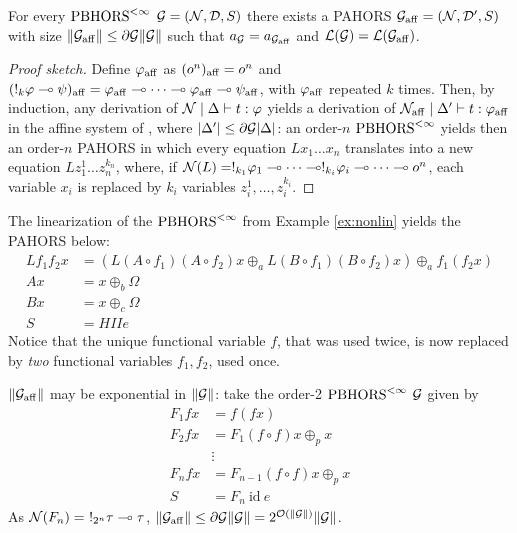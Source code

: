 \begin{theorem}[Linearization]
	\label{theorem:linearisation}
For every $\text{PBHORS}^{<\infty}$ $\mathcal{G}=(\mathcal{N}, \mathcal{D}, S)$ there exists a PAHORS $\mathcal{G}_{\mathrm{aff}}=(\mathcal{N}, \mathcal{D}',S)$ with size $\|\mathcal{G}_{\mathrm{aff}}\|\leq \partial\mathcal{G}{\|\mathcal{G}\|}$  such that 
$a_{\mathcal{G}}=a_{\mathcal{G}_{\mathrm{aff}}}$ and 
$\mathcal{L}(\mathcal{G})=\mathcal{L}(\mathcal{G}_{\mathrm{aff}})$.

\end{theorem}
\begin{proof}[Proof sketch]
Define $\varphi_{\mathrm{aff}}$ as $
(o^n)_{\mathrm{aff}}=o^n$ and 
$(!_k\varphi\multimap \psi)_{\mathrm{aff}}={\varphi_{\mathrm{aff}}\multimap\dots\multimap\varphi_{\mathrm{aff}}}\multimap\psi_{\mathrm{aff}}$, with $\varphi_{\mathrm{aff}}$ repeated $k$ times. 
Then, by induction, any derivation of $\mathcal{N}\mid \Delta\vdash t:\varphi$ yields a derivation of $\mathcal{N}_{\mathrm{aff}}\mid\Delta'\vdash t:\varphi_{\mathrm{aff}}$ in the affine system of \cite{DBLP:conf/lics/LiMO22}, where $|\Delta'|\leq \partial\mathcal{G}|\Delta|$: an order-$n$ $\text{PBHORS}^{<\infty}$ yields then an order-$n$ PAHORS in which every equation $Lx_1\dots x_n$ translates into a new equation $Lz_1^1\dots z_{n}^{k_n}$, where, if $\mathcal{N}(L)=!_{k_1}\varphi_1\multimap\dots \multimap !_{k_i}\varphi_i\multimap\dots\multimap o^n$, each variable $x_i$ is replaced by $k_i$ variables $z_i^1,\dots, z_{i}^{k_i}$.
\end{proof}


\begin{example}
The linearization of the $\text{PBHORS}^{<\infty}$ from Example \ref{ex:nonlin} yields the PAHORS below:
{\small
\begin{align*}\label{eq:phors2}
Lf_1f_2x&=( L(A\circ f_1)(A\circ f_2)x \oplus_{a}
L(B\circ f_1)(B\circ f_2)x )\oplus_{a}f_1(f_2x)\\
Ax&= x\oplus_{b} \Omega\\
Bx&=x\oplus_{c} \Omega\\
S&=HIIe
\end{align*}
}
Notice that the unique functional variable $f$, that was used twice, is now replaced by \emph{two} functional variables $f_1,f_2$, used once.
\end{example}


\begin{example}
$\|\mathcal{G}_{\mathrm{aff}}\|$ may be exponential in $\|\mathcal{G}\|$:
take the order-2 $\text{PBHORS}^{<\infty}$ $\mathcal{G}$ given by
{\small
\begin{align*}
F_1fx&= f(fx)\\
F_2f x&= F_1(f\circ f) x \oplus_{p} x\\
&\vdots\\
F_{n}fx&= F_{n-1}(f\circ f)x\oplus_{p}x\\
S&=F_n \ \mathrm{id} \  e
\end{align*}
}
As $\mathcal{N}(F_n)=\ !_{2^{n}}\tau\multimap\tau$, 
$\|\mathcal{G}_{\mathrm{aff}}\| \leq \partial\mathcal{G}\|\mathcal{G}\|=
2^{\mathcal{O}(\|\mathcal{G}\|)}\|\mathcal{G}\|$.
\end{example}



